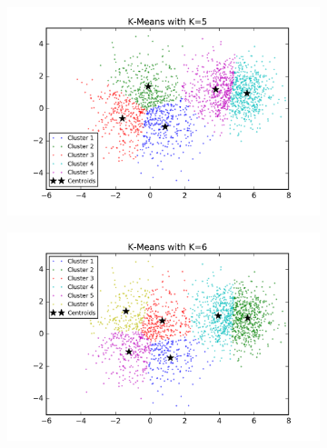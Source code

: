 \begin{description}
\begin{description}
\begin{figure}[!h]
\begin{subfigure}[b]{0.475\textwidth}
        \end{subfigure}
        \begin{subfigure}[b]{0.475\textwidth}  
            \centering 
            \includegraphics[width=\textwidth]{./figures/clustering_kMeans_5.png}
        \end{subfigure}
        \hfill
        \begin{subfigure}[b]{0.475\textwidth}   
            \centering 
            \includegraphics[width=\textwidth]{./figures/clustering_kMeans_6.png}
        \end{subfigure}
        \begin{subfigure}[b]{0.475\textwidth}   
            \centering 

\end{subfigure}
\end{figure}
\end{description}
\end{description}
